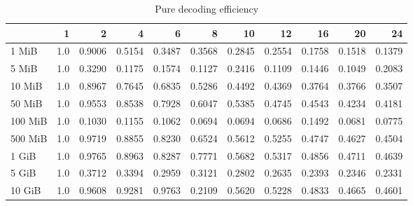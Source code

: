 \begin{table}[!h]
	\caption{Pure decoding efficiency}
\begin{tabular}{lrrrrrrrrrr}
	\toprule
		\diagbox{File sizes }{Threads} &   1  &      2  &      4  &      6  &      8  &      10 &      12 &      16 &      20 &      24 \\
	\midrule
	1 MiB   &  1.0 &  0.9006 &  0.5154 &  0.3487 &  0.3568 &  0.2845 &  0.2554 &  0.1758 &  0.1518 &  0.1379 \\
	5 MiB   &  1.0 &  0.3290 &  0.1175 &  0.1574 &  0.1127 &  0.2416 &  0.1109 &  0.1446 &  0.1049 &  0.2083 \\
	10 MiB  &  1.0 &  0.8967 &  0.7645 &  0.6835 &  0.5286 &  0.4492 &  0.4369 &  0.3764 &  0.3766 &  0.3507 \\
	50 MiB  &  1.0 &  0.9553 &  0.8538 &  0.7928 &  0.6047 &  0.5385 &  0.4745 &  0.4543 &  0.4234 &  0.4181 \\
	100 MiB &  1.0 &  0.1030 &  0.1155 &  0.1062 &  0.0694 &  0.0694 &  0.0686 &  0.1492 &  0.0681 &  0.0775 \\
	500 MiB &  1.0 &  0.9719 &  0.8855 &  0.8230 &  0.6524 &  0.5612 &  0.5255 &  0.4747 &  0.4627 &  0.4504 \\
	1 GiB   &  1.0 &  0.9765 &  0.8963 &  0.8287 &  0.7771 &  0.5682 &  0.5317 &  0.4856 &  0.4711 &  0.4639 \\
	5 GiB   &  1.0 &  0.3712 &  0.3394 &  0.2959 &  0.3121 &  0.2802 &  0.2635 &  0.2393 &  0.2346 &  0.2331 \\
	10 GiB  &  1.0 &  0.9608 &  0.9281 &  0.9763 &  0.2109 &  0.5620 &  0.5228 &  0.4833 &  0.4665 &  0.4601 \\
	\bottomrule
\end{tabular}
\end{table}